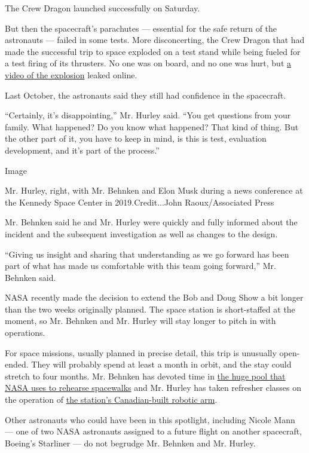 The Crew Dragon launched successfully on Saturday.

But then the spacecraft's parachutes --- essential for the safe return
of the astronauts --- failed in some tests. More disconcerting, the Crew
Dragon that had made the successful trip to space exploded on a test
stand while being fueled for a test firing of its thrusters. No one was
on board, and no one was hurt, but \href{https://youtu.be/scz-fFZT-dI}{a
video of the explosion} leaked online.

Last October, the astronauts said they still had confidence in the
spacecraft.

``Certainly, it's disappointing,'' Mr. Hurley said. ``You get questions
from your family. What happened? Do you know what happened? That kind of
thing. But the other part of it, you have to keep in mind, is this is
test, evaluation development, and it's part of the process.''

Image

Mr. Hurley, right, with Mr. Behnken and Elon Musk during a news
conference at the Kennedy Space Center in 2019.Credit...John
Raoux/Associated Press

Mr. Behnken said he and Mr. Hurley were quickly and fully informed about
the incident and the subsequent investigation as well as changes to the
design.

``Giving us insight and sharing that understanding as we go forward has
been part of what has made us comfortable with this team going
forward,'' Mr. Behnken said.

NASA recently made the decision to extend the Bob and Doug Show a bit
longer than the two weeks originally planned. The space station is
short-staffed at the moment, so Mr. Behnken and Mr. Hurley will stay
longer to pitch in with operations.

For space missions, usually planned in precise detail, this trip is
unusually open-ended. They will probably spend at least a month in
orbit, and the stay could stretch to four months. Mr. Behnken has
devoted time in
\href{https://www.nasa.gov/image-feature/neutral-buoyancy-laboratory}{the
huge pool that NASA uses to rehearse spacewalks} and Mr. Hurley has
taken refresher classes on the operation of
\href{https://www.asc-csa.gc.ca/eng/iss/canadarm2/default.asp}{the
station's Canadian-built robotic arm}.

Other astronauts who could have been in this spotlight, including Nicole
Mann --- one of two NASA astronauts assigned to a future flight on
another spacecraft, Boeing's Starliner --- do not begrudge Mr. Behnken
and Mr. Hurley.

